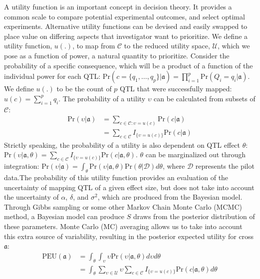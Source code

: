 A utility function is an important concept in decision theory. It provides a common scale to compare potential experimental outcomes, and select optimal experiments. Alternative utility functions can be devised and easily swapped to place value on differing aspects that investigator want to prioritize.  We define a utility function, $u(.)$, to map from $\mathcal{C}$ to the reduced utility space, $\mathcal{U}$, which we pose as a function of power, a natural quantity to prioritize. Consider the probability of a specific consequence, which will be a product of a function of the individual power for each QTL: $\text{Pr}(c=\{q_{1}, \hdots, q_{p}\}|\mathfrak{a}) = \prod_{i=1}^{p}\text{Pr}(Q_{i} = q_{i}|\mathfrak{a})$.
We define $u(.)$ to be the count of $p$ QTL that were successfully mapped: $u(c) = \sum_{i=1}^{p}q_{i}$. The probability of a utility $\upsilon$ can be calculated from subsets of $\mathcal{C}$:
\begin{align} 
	\text{Pr}(\upsilon|\mathfrak{a}) &= \sum_{c \in \mathcal{C} : \upsilon = u(c)}\text{Pr}(c|\mathfrak{a}) \\ 
    &= \sum_{c \in \mathcal{C}}I_{\{\upsilon = u(c)\}}\text{Pr}(c|\mathfrak{a}) \nonumber
    \label{eq:utility}
\end{align}
Strictly speaking, the probability of a utility is also dependent on QTL effect $\theta$: $\text{Pr}(\upsilon|\mathfrak{a}, \theta) = \sum_{c \in \mathcal{C}}I_{\{\upsilon = u(c)\}}\text{Pr}(c|\mathfrak{a},\theta)$. $\theta$ can be marginalized out through integration: $\text{Pr}(\upsilon|\mathfrak{a}) = \int_{\theta}\text{Pr}(\upsilon|\mathfrak{a}, \theta)\text{Pr}(\theta|\mathcal{D})d\theta$, where $\mathcal{D}$ represents the pilot data.The probability of this utility function provides an evaluation of the uncertainty of mapping QTL of a given effect size, but does not take into account the uncertainty of $\alpha$, $\delta$, and $\sigma^{2}$, which are produced from the Bayesian model. Through Gibbs sampling or some other Markov Chain Monte Carlo (MCMC) method, a Bayesian model can produce $S$ draws from the posterior distribution of these parameters. Monte Carlo (MC) averaging allows us to take into account this extra source of variability, resulting in the posterior expected utility for cross $\mathfrak{a}$:
\begin{align}
	\text{PEU}(\mathfrak{a}) &= \int_{\theta} \int_{\upsilon} \upsilon \text{Pr}(\upsilon|\mathfrak{a}, \theta)d\upsilon d\theta \\
	&= \int_{\theta} \sum_{\upsilon \in \mathcal{U}} \upsilon \sum_{c \in \mathcal{C}}I_{\{\upsilon = u(c)\}}\text{Pr}(c|\mathfrak{a},\theta)d\theta \nonumber
    \label{eq:peu}
\end{align} 
